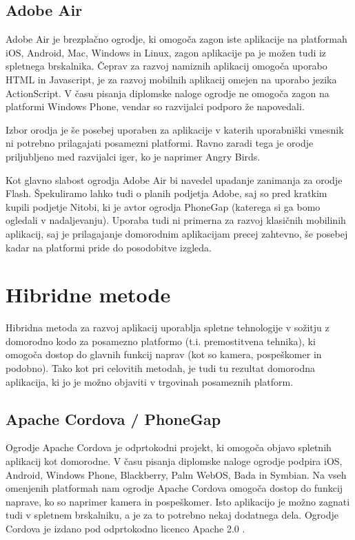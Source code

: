 \subsection{Adobe Air}

Adobe Air\cite{adobeair} je brezplačno ogrodje, ki omogoča zagon iste aplikacije na platformah iOS, Android, Mac, Windows in Linux, zagon aplikacije pa je možen tudi iz spletnega brskalnika. Čeprav za razvoj namiznih aplikacij omogoča uporabo HTML in Javascript, je za razvoj mobilnih aplikacij omejen na uporabo jezika ActionScript. V času pisanja diplomske naloge ogrodje ne omogoča zagon na platformi Windows Phone, vendar so razvijalci podporo že napovedali.

Izbor orodja je še posebej uporaben za aplikacije v katerih uporabniški vmesnik ni potrebno prilagajati posamezni platformi. Ravno zaradi tega je orodje priljubljeno med razvijalci iger, ko je naprimer Angry Birds\cite{angrybirds}.

Kot glavno slabost ogrodja Adobe Air bi navedel upadanje zanimanja za orodje Flash. Špekuliramo lahko tudi o planih podjetja Adobe, saj so pred kratkim kupili podjetje Nitobi, ki je avtor ogrodja PhoneGap (katerega si ga bomo ogledali v nadaljevanju). Uporaba tudi ni primerna za razvoj klasičnih mobilinih aplikacij, saj je prilagajanje domorodnim aplikacijam precej zahtevno, še posebej kadar na platformi pride do posodobitve izgleda.

\section{Hibridne metode}

Hibridna metoda za razvoj aplikacij uporablja spletne tehnologije v sožitju z domorodno kodo za posamezno platformo (t.i. premostitvena tehnika), ki omogoča dostop do glavnih funkcij naprav (kot so kamera, pospeškomer in podobno). Tako kot pri celovitih metodah, je tudi tu rezultat domorodna aplikacija, ki jo je možno objaviti v trgovinah posameznih platform.

\subsection{Apache Cordova / PhoneGap}

Ogrodje Apache Cordova\cite{cordova} je odprtokodni projekt, ki omogoča objavo spletnih aplikacij kot domorodne. V času pisanja diplomske naloge ogrodje podpira iOS, Android, Windows Phone, Blackberry, Palm WebOS, Bada in Symbian. Na vseh omenjenih platformah nam ogrodje Apache Cordova omogoča dostop do funkcij naprave, ko so naprimer kamera in pospeškomer. Isto aplikacijo je možno zagnati tudi v spletnem brskalniku, a je za to potrebno nekaj dodatnega dela. Ogrodje Cordova je izdano pod odprtokodno licenco Apache 2.0 \cite{apache-licence}.

